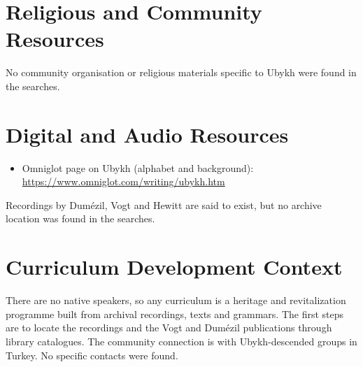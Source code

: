 \documentclass[12pt]{article}
\begin{document}
\section{Religious and Community Resources}
No community organisation or religious materials specific to Ubykh were found in the searches.

\section{Digital and Audio Resources}
\begin{itemize}
\item Omniglot page on Ubykh (alphabet and background): \url{https://www.omniglot.com/writing/ubykh.htm}
\end{itemize}
Recordings by Dum\'ezil, Vogt and Hewitt are said to exist, but no archive location was found in the searches.

\section{Curriculum Development Context}
There are no native speakers, so any curriculum is a heritage and revitalization programme built from archival recordings, texts and grammars. The first steps are to locate the recordings and the Vogt and Dum\'ezil publications through library catalogues. The community connection is with Ubykh-descended groups in Turkey. No specific contacts were found.
\end{document}
